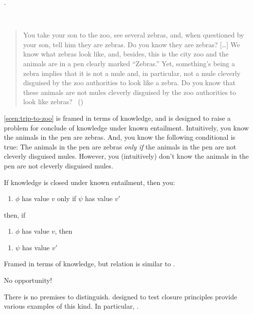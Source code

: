 \begin{note}
  \citeauthor{Dretske:1970to}.
  \begin{scenario}\mbox{ }
    \label{scen:trip-to-zoo}
    \vspace{-\baselineskip}
    \begin{quote}
      You take your son to the zoo, see several zebras, and, when questioned by your son, tell him they are zebras.
      Do you know they are zebras?
      [\dots]
      We know what zebras look like, and, besides, this is the city zoo and the animals are in a pen clearly marked ``Zebras.''
      Yet, something's being a zebra implies that it is not a mule and, in particular, not a mule cleverly disguised by the zoo authorities to look like a zebra.
      Do you know that these animals are not mules cleverly disguised by the zoo authorities to look like zebras?\newline
      \mbox{ }\hfill\mbox{(\citeyear[1015--1016]{Dretske:1970to})}
    \end{quote}
    \vspace{-\baselineskip}
  \end{scenario}

  \autoref{scen:trip-to-zoo} is framed in terms of knowledge, and is designed to raise a problem for conclude of knowledge under known entailment.
  Intuitively, you know the animals in the pen are zebras.
  And, you know the following conditional is true:
  The animals in the pen are zebras \emph{only if} the animals in the pen are not cleverly disguised mules.
  However, you (intuitively) don't know the animals in the pen are not cleverly disguised mules.

  If knowledge is closed under known entailment, then you:
  \begin{enumerate}
  \item \(\phi\) has value \(v\) only if \(\psi\) has value \(v'\)
  \end{enumerate}
  then, if
  \begin{enumerate}
  \item
    \(\phi\) has value \(v\), then
  \end{enumerate}
  \begin{enumerate}
  \item \(\psi\) has value \(v'\)
  \end{enumerate}

  Framed in terms of knowledge, but relation is similar to \curb{}.

  No opportunity!

  There is no premises to distinguish.
   designed to test closure principles provide various examples of this kind.
  In particular, \citeauthor{Wright:2011wn}.
\end{note}

